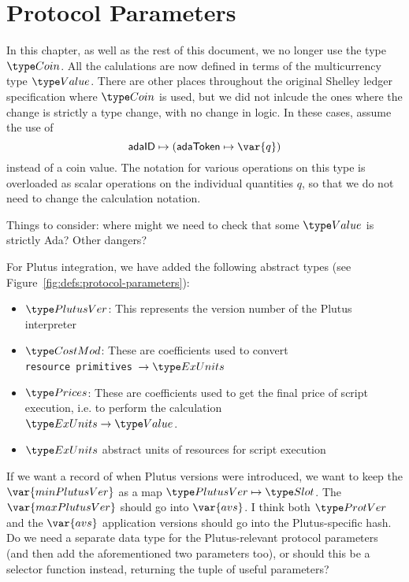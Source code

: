 \section{Protocol Parameters}
\label{sec:protocol-parameters}

\begin{note}
  In this chapter, as well as the rest of this document, we no longer use the type $\Coin$.
  All the calulations are now defined in terms of the multicurrency type $\Value$.
  There are other places throughout the original Shelley ledger specification where
  $\Coin$ is used, but we did not inlcude the ones where the change is strictly a type
  change, with no change in logic. In these cases, assume the use of
  \[\mathsf{adaID} \mapsto (\mathsf{adaToken} \mapsto \var{q})\]
  instead of a coin value. The notation for various operations on this type
  is overloaded as scalar operations on the individual quantities $q$, so that
  we do not need to change the calculation notation.

  Things to consider: where might we need to check that some $\Value$ is strictly
  Ada? Other dangers?
\end{note}

For Plutus integration, we have added the following abstract types
(see Figure~\ref{fig:defs:protocol-parameters}):

\begin{itemize}
\item $\PlutusVer$: This represents the version number of the Plutus interpreter
\item $\CostMod$: These are coefficients used to convert \\
\texttt{resource primitives}~$\to \ExUnits$
\item $\Prices$: These are coefficients used to get the final price of script
execution, i.e. to perform the calculation \\
$\ExUnits \to \Value$.
\item $\ExUnits$ abstract units of resources for script execution
\end{itemize}

\begin{note}
  If we want a record of when Plutus versions were introduced, we want to keep
  the $\var{minPlutusVer}$ as a map $\PlutusVer \mapsto \Slot$.
  The $\var{maxPlutusVer}$ should go into $\var{avs}$. I think both
  $\ProtVer$ and the $\var{avs}$ application versions should go into the
  Plutus-specific hash. Do we need a separate data type for the Plutus-relevant
  protocol parameters (and then add the aforementioned two parameters too),
  or should this be a selector function instead, returning the tuple of
  useful parameters?
\end{note}

